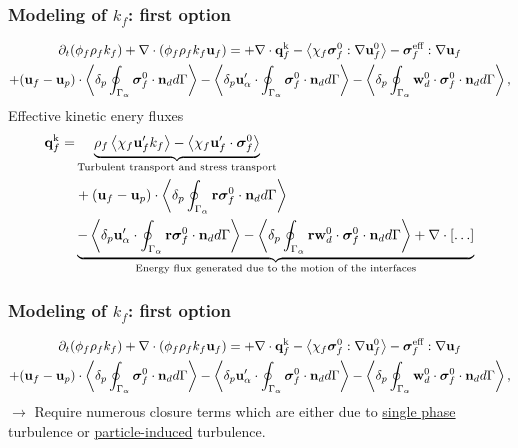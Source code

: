 \documentclass{sintefbeamer}
\begin{document}
\begin{frame}
  \frametitle{Modeling of $k_f$: first option}

\begin{multline}
  \partial_t (\phi_f\rho_fk_f)  
    + \mathbf{\nabla}\cdot (
        \phi_f\rho_fk_f\textbf{u}_f
        )
        = 
      + \mathbf{\nabla}\cdot  \textbf{q}_f^\text{k}
    - \left<\chi_f\bm{\sigma}_f^0 : \mathbf{\nabla} \textbf{u}_f^0\right>
    - \bm{\sigma}_f^\text{eff} : \mathbf{\nabla} \textbf{u}_f
    \nonumber \\
    + (\textbf{u}_f - \textbf{u}_p)\cdot \left<\delta_p \oint_{\Gamma_{\alpha}} {\bm{\sigma}_f^0 \cdot \textbf{n}_d} d\Gamma\right> 
    - \left<\delta_p  \textbf{u}_\alpha' \cdot \oint_{\Gamma_{\alpha}}   \bm{\sigma}_f^0 \cdot \textbf{n}_d d\Gamma\right>
    - \left<\delta_p  \oint_{\Gamma_{\alpha}} \textbf{w}_d^0 \cdot \bm{\sigma}_f^0 \cdot \textbf{n}_d d\Gamma\right>,
\end{multline}
Effective kinetic enery fluxes
\begin{align*}
     \textbf{q}_f^\text{k}
    =& \underbrace{\rho_f \left<\chi_f \textbf{u}_f' k_f\right> 
    - \left<\chi_f \textbf{u}_f' \cdot \bm{\sigma}_f^0\right>}_\text{Turbulent transport and stress transport}\\
    &+ (\textbf{u}_f - \textbf{u}_p)\cdot
    \left<\delta_p \oint_{\Gamma_{\alpha}} {\textbf{r}\bm{\sigma}_f^0 \cdot \textbf{n}_d} d\Gamma\right>\\
    &
    \underbrace{- \left<\delta_p  \textbf{u}_\alpha' \cdot \oint_{\Gamma_{\alpha}}  \textbf{r} \bm{\sigma}_f^0 \cdot \textbf{n}_d d\Gamma\right>
    - \left<\delta_p  \oint_{\Gamma_{\alpha}} \textbf{r}\textbf{w}_d^0 \cdot \bm{\sigma}_f^0 \cdot \textbf{n}_d d\Gamma\right>
    + \mathbf{\nabla}\cdot[\ldots]}_\text{Energy flux generated due to the motion of the interfaces}
\end{align*}

\end{frame}


\begin{frame}
  \frametitle{Modeling of $k_f$: first option}

\begin{multline}
  \partial_t (\phi_f\rho_fk_f)  
    + \mathbf{\nabla}\cdot (
        \phi_f\rho_fk_f\textbf{u}_f
        )
        = 
      + \mathbf{\nabla}\cdot  \textbf{q}_f^\text{k}
    - \left<\chi_f\bm{\sigma}_f^0 : \mathbf{\nabla} \textbf{u}_f^0\right>
    - \bm{\sigma}_f^\text{eff} : \mathbf{\nabla} \textbf{u}_f
    \nonumber \\
    + (\textbf{u}_f - \textbf{u}_p)\cdot \left<\delta_p \oint_{\Gamma_{\alpha}} {\bm{\sigma}_f^0 \cdot \textbf{n}_d} d\Gamma\right> 
    - \left<\delta_p  \textbf{u}_\alpha' \cdot \oint_{\Gamma_{\alpha}}   \bm{\sigma}_f^0 \cdot \textbf{n}_d d\Gamma\right>
    - \left<\delta_p  \oint_{\Gamma_{\alpha}} \textbf{w}_d^0 \cdot \bm{\sigma}_f^0 \cdot \textbf{n}_d d\Gamma\right>,
\end{multline}
\vfill
$\to$ Require numerous closure terms which are either due to \underline{single phase} turbulence or \underline{particle-induced} turbulence. 

\end{frame}
\end{document}
